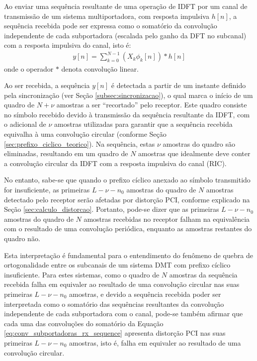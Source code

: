 Ao enviar uma sequência resultante de uma operação de IDFT por um canal de transmissão de um sistema multiportadora, com resposta impulsiva $h[n]$, a sequência recebida pode ser expressa como o somatório da convolução independente de cada subportadora (escalada pelo ganho da DFT no subcanal) com a resposta impulsiva do canal, isto é:
\begin{align}
y[n] = \sum \limits_{k=0}^{N-1} (X_k \phi_k[n]) * h[n]
\label{eq:conv_subportadoras_rx_sequence}
\end{align}
onde o operador $*$ denota convolução linear.

Ao ser recebida, a sequência $y[n]$ é detectada a partir de um instante definido pela sincronização (ver Seção \ref{subsec:sincronizacao}), o qual marca o início de um quadro de $N + \nu$ amostras a ser ``recortado'' pelo receptor. Este quadro consiste no símbolo recebido devido à transmissão da sequência resultante da IDFT, com o adicional de $\nu$ amostras utilizadas para garantir que a sequência recebida equivalha à uma convolução circular (conforme Seção \ref{sec:prefixo_ciclico_teorico}). Na sequência, estas $\nu$ amostras do quadro são eliminadas, resultando em um quadro de $N$ amostras que idealmente deve conter a convolução circular da IDFT com a resposta impulsiva do canal (RIC).

No entanto, sabe-se que quando o prefixo cíclico anexado ao símbolo transmitido for insuficiente, as primeiras $L - \nu - n_0$ amostras do quadro de $N$ amostras detectado pelo receptor serão afetadas por distorção PCI, conforme explicado na Seção \ref{sec:calculo_distorcao}. Portanto, pode-se dizer que as primeiras $L - \nu - n_0$ amostras do quadro de $N$ amostras recebidas no receptor falham na equivalência com o resultado de uma convolução periódica, enquanto as amostras restantes do quadro não.

Esta interpretação é fundamental para o entendimento do fenômeno de quebra de ortogonalidade entre os subcanais de um sistema DMT com prefixo cíclico insuficiente. Para estes sistemas, como o quadro de $N$ amostras da sequência recebida falha em equivaler ao resultado de uma convolução circular nas suas primeiras $L - \nu - n_0$ amostras, e devido a sequência recebida poder ser interpretada como o somatório das sequências resultantes da convolução independente de cada subportadora com o canal, pode-se também afirmar que cada uma das convoluções do somatório da Equação \ref{eq:conv_subportadoras_rx_sequence} apresenta distorção PCI nas suas primeiras $L - \nu - n_0$ amostras, isto é, falha em equivaler ao resultado de uma convolução circular.

